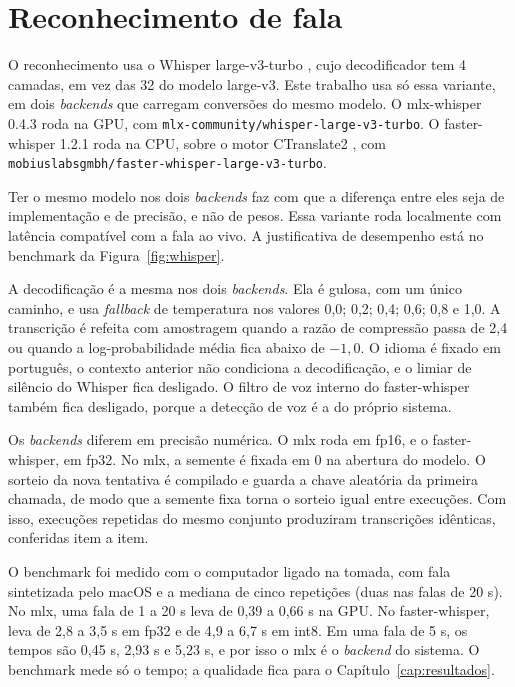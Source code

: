 \documentclass[
    12pt,                %
    openright,           %
    oneside,             %
    a4paper,             %
    english,             %
    brazil               %
]{abntex2}
\begin{document}

\section{Reconhecimento de fala}
\label{sec:asr}

O reconhecimento usa o Whisper large-v3-turbo \cite{Radford2023, OpenAI2024Turbo}, cujo decodificador tem 4 camadas, em vez das 32 do modelo large-v3. Este trabalho usa só essa variante, em dois \textit{backends} que carregam conversões do mesmo modelo. O mlx-whisper 0.4.3 \cite{MLX2023} roda na GPU, com \texttt{mlx-community/\allowbreak{}whisper-\allowbreak{}large-\allowbreak{}v3-\allowbreak{}turbo}. O faster-whisper 1.2.1 \cite{FasterWhisper} roda na CPU, sobre o motor CTranslate2 \cite{CTranslate2}, com \texttt{mobiuslabsgmbh/\allowbreak{}faster-\allowbreak{}whisper-\allowbreak{}large-\allowbreak{}v3-\allowbreak{}turbo}.

Ter o mesmo modelo nos dois \textit{backends} faz com que a diferença entre eles seja de implementação e de precisão, e não de pesos. Essa variante roda localmente com latência compatível com a fala ao vivo. A justificativa de desempenho está no benchmark da Figura~\ref{fig:whisper}.

A decodificação é a mesma nos dois \textit{backends}. Ela é gulosa, com um único caminho, e usa \textit{fallback} de temperatura nos valores 0,0; 0,2; 0,4; 0,6; 0,8 e 1,0. A transcrição é refeita com amostragem quando a razão de compressão passa de 2,4 ou quando a log-probabilidade média fica abaixo de $-1{,}0$. O idioma é fixado em português, o contexto anterior não condiciona a decodificação, e o limiar de silêncio do Whisper fica desligado. O filtro de voz interno do faster-whisper também fica desligado, porque a detecção de voz é a do próprio sistema.

Os \textit{backends} diferem em precisão numérica. O mlx roda em fp16, e o faster-whisper, em fp32. No mlx, a semente é fixada em 0 na abertura do modelo. O sorteio da nova tentativa é compilado e guarda a chave aleatória da primeira chamada, de modo que a semente fixa torna o sorteio igual entre execuções. Com isso, execuções repetidas do mesmo conjunto produziram transcrições idênticas, conferidas item a item.

O benchmark foi medido com o computador ligado na tomada, com fala sintetizada pelo macOS e a mediana de cinco repetições (duas nas falas de 20 s). No mlx, uma fala de 1 a 20 s leva de 0,39 a 0,66 s na GPU. No faster-whisper, leva de 2,8 a 3,5 s em fp32 e de 4,9 a 6,7 s em int8. Em uma fala de 5 s, os tempos são 0,45 s, 2,93 s e 5,23 s, e por isso o mlx é o \textit{backend} do sistema. O benchmark mede só o tempo; a qualidade fica para o Capítulo~\ref{cap:resultados}.
\end{document}
